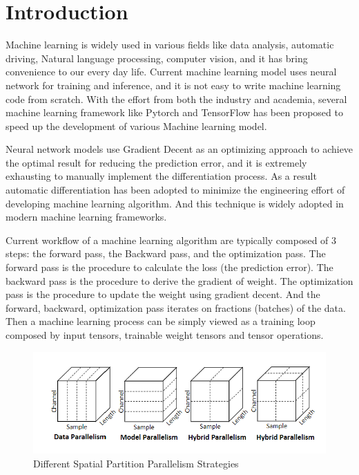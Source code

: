 \documentclass[sigplan]{acmart}\settopmatter{printfolios=true,printccs=false,printacmref=false}
\begin{document}
\section{Introduction}
Machine learning is widely used in various fields like data analysis, automatic driving, Natural language processing, computer vision, and it has bring convenience to our every day life. Current machine learning model uses neural network for training and inference, and it is not easy to write machine learning code from scratch. With the effort from both the industry and academia, several machine learning framework like Pytorch\cite{paszke2019pytorch} and TensorFlow\cite{abadi2016tensorflow} has been proposed to speed up the development of various Machine learning model.\par
Neural network models use Gradient Decent as an optimizing approach to achieve the optimal result for reducing the prediction error, and it is extremely exhausting to manually implement the differentiation process. As a result automatic differentiation\cite{baydin2018automatic} has been adopted to minimize the engineering effort of developing machine learning algorithm. And this technique is widely adopted in modern machine learning frameworks. \par
 Current workflow of a machine learning algorithm are typically composed of 3 steps: the forward pass, the Backward pass, and the optimization pass. The forward pass is the procedure to calculate the loss (the prediction error). The backward pass is the procedure to derive the gradient of weight. The optimization pass is the procedure to update the weight using gradient decent. And the forward, backward, optimization pass iterates on fractions (batches) of the data. Then a machine learning process can be simply viewed as a training loop composed by input tensors, trainable weight tensors and tensor operations. \par
 \begin{figure}[htbp]
  \centering
  \includegraphics[scale=0.8]{ParallelDimension}
  \caption{Different Spatial Partition Parallelism Strategies}
  \label{fig:paralleldimension}
\end{figure}
\end{document}
